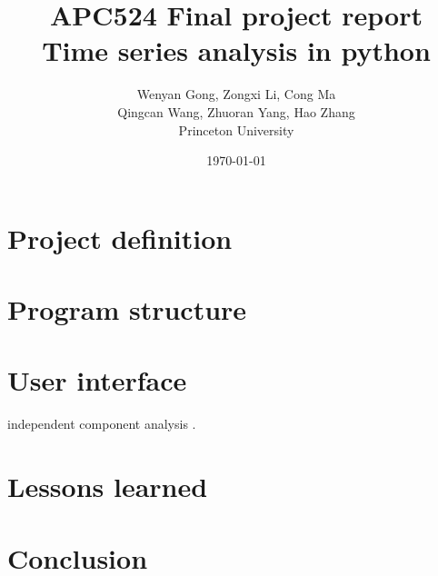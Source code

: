 \documentclass[12pt,a4paper]{article}
\title{APC524 Final project report
\\Time series analysis in python}
\author{Wenyan Gong, Zongxi Li, Cong Ma
\\Qingcan Wang, Zhuoran Yang, Hao Zhang
\\Princeton University}
\date{\today}
\begin{document}
\maketitle

\section{Project definition}

\section{Program structure}

\section{User interface}

independent component analysis \cite{hyvarinen2000independent}.

\section{Lessons learned}

\section{Conclusion}


\end{document}
